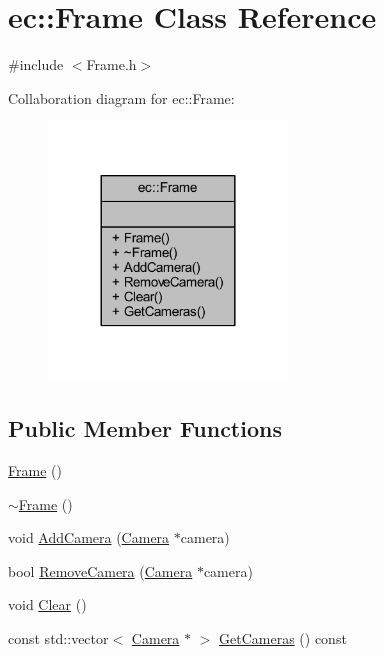 \hypertarget{classec_1_1_frame}{}\section{ec\+:\+:Frame Class Reference}
\label{classec_1_1_frame}


{\ttfamily \#include $<$Frame.\+h$>$}



Collaboration diagram for ec\+:\+:Frame\+:
\nopagebreak
\begin{figure}[H]
\begin{center}
\leavevmode
\includegraphics[width=180pt]{classec_1_1_frame__coll__graph}
\end{center}
\end{figure}
\subsection*{Public Member Functions}
\begin{DoxyCompactItemize}
\item 
\mbox{\hyperlink{classec_1_1_frame_a80ed1da85818f646b6b80fb6c8a6c2a6}{Frame}} ()
\item 
\mbox{\hyperlink{classec_1_1_frame_af2b2c733cacb47d99e460a2b75667eaa}{$\sim$\+Frame}} ()
\item 
void \mbox{\hyperlink{classec_1_1_frame_ac77592eb8af14980e6b984c8433ffe8c}{Add\+Camera}} (\mbox{\hyperlink{classec_1_1_camera}{Camera}} $\ast$camera)
\item 
bool \mbox{\hyperlink{classec_1_1_frame_a03d78a820026a27a6f18ec135283e22b}{Remove\+Camera}} (\mbox{\hyperlink{classec_1_1_camera}{Camera}} $\ast$camera)
\item 
void \mbox{\hyperlink{classec_1_1_frame_a9756a68f9db16a43cf23dac3f13c0672}{Clear}} ()
\item 
const std\+::vector$<$ \mbox{\hyperlink{classec_1_1_camera}{Camera}} $\ast$ $>$ \mbox{\hyperlink{classec_1_1_frame_ab0a5922f4be8a3565617418f447d4a5e}{Get\+Cameras}} () const
\end{DoxyCompactItemize}


